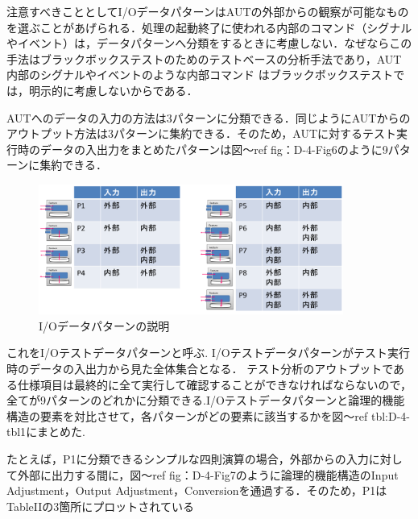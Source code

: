 \documentclass[a4paper,12pt]{jreport}
\begin{document}
注意すべきこととしてI/OデータパターンはAUTの外部からの観察が可能なものを選ぶことがあげられる．処理の起動終了に使われる内部のコマンド（シグナルやイベント）は，データパターンへ分類をするときに考慮しない．なぜならこの手法はブラックボックステストのためのテストベースの分析手法であり，AUT内部のシグナルやイベントのような内部コマンド はブラックボックステストでは，明示的に考慮しないからである．

AUTへのデータの入力の方法は3パターンに分類できる．同じようにAUTからのアウトプット方法は3パターンに集約できる．そのため，AUTに対するテスト実行時のデータの入出力をまとめたパターンは図〜ref {fig：D-4-Fig6}のように9パターンに集約できる．
    \begin{figure}[htbp]
  \begin{center}
  \includegraphics[width=10cm]{./image/D-3-Fig5.png}
  \caption{I/Oデータパターンの説明}
  \label{fig:D-4-Fig6}
  \end{center}
   \end{figure}

これをI/Oテストデータパターンと呼ぶ.
I/Oテストデータパターンがテスト実行時のデータの入出力から見た全体集合となる．
テスト分析のアウトプットである仕様項目は最終的に全て実行して確認することができなければならないので，全てが9パターンのどれかに分類できる.I/Oテストデータパターンと論理的機能構造の要素を対比させて，各パターンがどの要素に該当するかを図〜ref {tbl:D-4-tbl1}にまとめた.


たとえば，P1に分類できるシンプルな四則演算の場合，外部からの入力に対して外部に出力する間に，図〜ref {fig：D-4-Fig7}のように論理的機能構造のInput Adjustment，Output Adjustment，Conversionを通過する．そのため，P1はTableIIの3箇所にプロットされている
\end{document}
